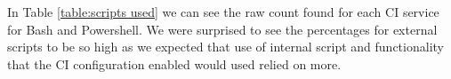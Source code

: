 \documentclass[10pt,conference]{IEEEtran}
\begin{document}
In Table \ref{table:scripts used} we can see the raw count found for each CI service for Bash and Powershell. We were surprised to see the percentages for external scripts to be so high as we expected that use of internal script and functionality that the CI configuration enabled would used relied on more.

\begin{table}
  
\end{table}




\end{document}
